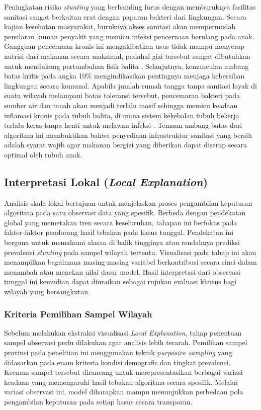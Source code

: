 \begin{enumerate}[listparindent=\parindent]
    \indent Peningkatan risiko \textit{stunting} yang berbanding lurus dengan memburuknya fasilitas sanitasi sangat berkaitan erat dengan paparan bakteri dari lingkungan. Secara kajian kesehatan masyarakat, buruknya akses sanitasi akan mempermudah penularan kuman penyakit yang memicu infeksi pencernaan berulang pada anak. Gangguan pencernaan kronis ini mengakibatkan usus tidak mampu menyerap nutrisi dari makanan secara maksimal, padahal gizi tersebut sangat dibutuhkan untuk mendukung pertumbuhan fisik balita \cite{kemenkes2022tatalaksana}. Selanjutnya, kemunculan ambang batas kritis pada angka 10\% mengindikasikan pentingnya menjaga kebersihan lingkungan secara komunal. Apabila jumlah rumah tangga tanpa sanitasi layak di suatu wilayah melampaui batas toleransi tersebut, pencemaran bakteri pada sumber air dan tanah akan menjadi terlalu masif sehingga memicu keadaan inflamasi kronis pada tubuh balita, di mana sistem kekebalan tubuh bekerja terlalu keras tanpa henti untuk melawan infeksi \cite{torlesse2016determinants}. Temuan ambang batas dari algoritma ini membuktikan bahwa penyediaan infrastruktur sanitasi yang bersih adalah syarat wajib agar makanan bergizi yang diberikan dapat diserap secara optimal oleh tubuh anak.

\end{enumerate}

\subsection{Interpretasi Lokal (\textit{Local Explanation})}
Analisis skala lokal bertujuan untuk menjelaskan proses pengambilan keputusan algoritma pada satu observasi data yang spesifik. Berbeda dengan pendekatan global yang memetakan tren secara keseluruhan, tahapan ini berfokus pada faktor-faktor pendorong hasil tebakan pada kasus tunggal. Pendekatan ini berguna untuk memahami alasan di balik tingginya atau rendahnya prediksi prevalensi \textit{stunting} pada sampel wilayah tertentu. Visualisasi pada tahap ini akan menampilkan bagaimana masing-masing variabel berkontribusi secara rinci dalam menambah atau menekan nilai dasar model. Hasil interpretasi dari observasi tunggal ini kemudian dapat diuraikan sebagai rujukan evaluasi khusus bagi wilayah yang bersangkutan.

\subsubsection{Kriteria Pemilihan Sampel Wilayah}
Sebelum melakukan ekstraksi visualisasi \textit{Local Explanation}, tahap penentuan sampel observasi perlu dilakukan agar analisis lebih terarah. Pemilihan sampel provinsi pada penelitian ini menggunakan teknik \textit{purposive sampling} yang didasarkan pada enam kriteria kondisi demografis dan tingkat prevalensi. Keenam sampel tersebut dirancang untuk merepresentasikan berbagai variasi keadaan yang memengaruhi hasil tebakan algoritma secara spesifik. Melalui variasi observasi ini, model diharapkan mampu menunjukkan perbedaan pola pengambilan keputusan pada setiap kasus secara transparan.

